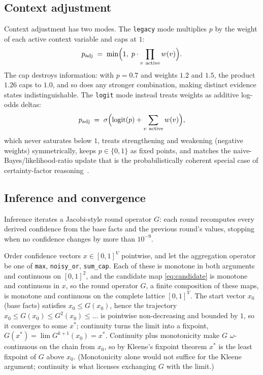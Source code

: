 \subsection{Context adjustment}\label{sec:context}

Context adjustment has two modes. The \texttt{legacy} mode multiplies
$p$ by the weight of each active context variable and caps at $1$:
\begin{equation}
p_{\text{adj}} \;=\; \min\Bigl(1,\; p \cdot \prod_{v\ \text{active}} w(v)\Bigr).
\label{eq:legacy}
\end{equation}
The cap destroys information: with $p=0.7$ and weights $1.2$ and $1.5$,
the product $1.26$ caps to $1.0$, and so does any stronger
combination, making distinct evidence states indistinguishable. The
\texttt{logit} mode instead treats weights as additive log-odds
deltas:
\begin{equation}
p_{\text{adj}} \;=\; \sigma\Bigl(\operatorname{logit}(p) + \sum_{v\ \text{active}} w(v)\Bigr),
\label{eq:logit}
\end{equation}
which never saturates below $1$, treats strengthening and weakening
(negative weights) symmetrically, keeps $p\in\{0,1\}$ as fixed points,
and matches the naive-Bayes/likelihood-ratio update that is the
probabilistically coherent special case of certainty-factor
reasoning~\cite{heckerman1986}.

\subsection{Inference and convergence}

Inference iterates a Jacobi-style round operator $G$: each round
recomputes every derived confidence from the base facts and the previous
round's values, stopping when no confidence changes by more than
$10^{-9}$.

\begin{proposition}[Convergence]\label{prop:convergence}
Order confidence vectors $x\in[0,1]^V$ pointwise, and let the
aggregation operator be one of \texttt{max}, \texttt{noisy\_or},
\texttt{sum\_cap}. Each of these is monotone in both arguments and
continuous on $[0,1]^2$, and the candidate map \eqref{eq:candidate} is
monotone and continuous in $x$, so the round operator $G$, a finite
composition of these maps, is monotone and continuous on the complete
lattice $[0,1]^V$. The start vector $x_0$ (base facts) satisfies
$x_0 \le G(x_0)$, hence the trajectory
$x_0 \le G(x_0) \le G^2(x_0) \le \dots$ is pointwise non-decreasing and
bounded by $1$, so it converges to some $x^*$; continuity turns the
limit into a fixpoint, $G(x^*) = \lim G^{k+1}(x_0) = x^*$. Continuity
plus monotonicity make $G$ $\omega$-continuous on the chain from $x_0$,
so by Kleene's fixpoint theorem $x^*$ is the least fixpoint of $G$
above $x_0$. (Monotonicity alone would not suffice for the Kleene
argument; continuity is what licenses exchanging $G$ with the limit.)
\end{proposition}

